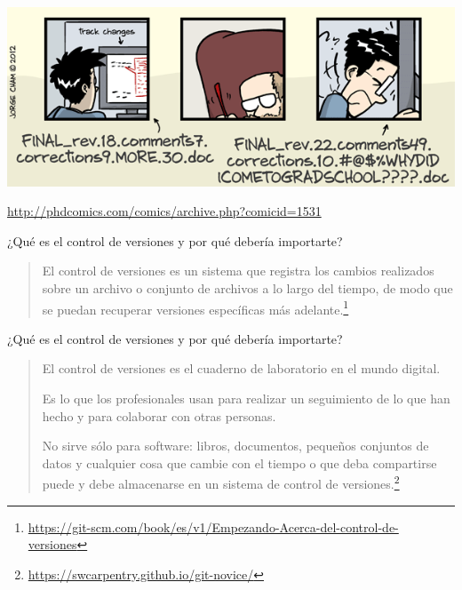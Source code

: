 \documentclass[xcolor={usenames,svgnames,dvipsnames}]{beamer}
\begin{document}
\begin{frame}[plain,label={sec:org42a1ff1}]{}
\begin{center}
\includegraphics[width=0.9\paperwidth]{figs/phdcomic_finaldoc_3.png}
\end{center}

\url{http://phdcomics.com/comics/archive.php?comicid=1531}
\end{frame}

\begin{frame}[label={sec:orgabc4671}]{¿Qué es el control de versiones y por qué debería importarte?}
\begin{quote}
El control de versiones es un sistema que \alert{registra los cambios}
realizados sobre un archivo o conjunto de archivos a lo largo del
tiempo, de modo que se puedan \alert{recuperar} versiones específicas más
adelante.\footnote{\url{https://git-scm.com/book/es/v1/Empezando-Acerca-del-control-de-versiones}}
\end{quote}
\end{frame}

\begin{frame}[label={sec:orgac40155}]{¿Qué es el control de versiones y por qué debería importarte?}
\begin{quote}
El control de versiones es el cuaderno de laboratorio en el
mundo digital. 

Es lo que los profesionales usan para realizar un
\alert{seguimiento} de lo que han hecho y para \alert{colaborar} con otras
personas. 

\alert{No sirve sólo para software}: libros, documentos, pequeños
conjuntos de datos y cualquier cosa que cambie con el tiempo o que
deba compartirse puede y debe almacenarse en un sistema de control de
versiones.\footnote{\url{https://swcarpentry.github.io/git-novice/}}
\end{quote}
\end{frame}
\end{document}
